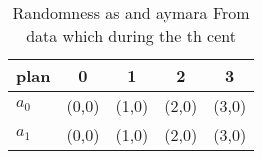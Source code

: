 \documentclass[a4paper]{article}
\begin{document}
\begin{table}
\begin{adjustbox}{width=0.6\columnwidth}
\begin{tabular}{|l|l|l|l|l|}
\hline
\textbf{plan} & \multicolumn{1}{c|}{\textbf{0}} & \multicolumn{1}{c|}{\textbf{1}} & \multicolumn{1}{c|}{\textbf{2}} & \multicolumn{1}{c|}{\textbf{3}} \\ \hline
\textbf{$a_0$}  & (0,0) & (1,0) & (2,0) & (3,0) \\ \hline
\textbf{$a_1$}  & (0,0) & (1,0) & (2,0) & (3,0) \\ \hline
\end{tabular}
\end{adjustbox}
\caption{Randomness as and aymara From data which during the th cent
}
\end{table}
\end{document}
